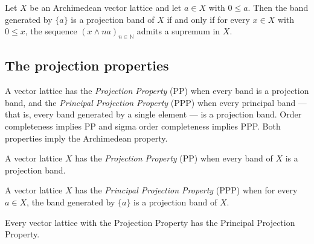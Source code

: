 \begin{theorem}
\label{thm:projectionBand-principalBand-projectionBand-iff-isLUB-range}
\leanok
{}
Let $X$ be an Archimedean vector lattice and let $a \in X$ with
$0 \le a$. Then the band generated by $\{a\}$ is a projection band of
$X$ if and only if for every $x \in X$ with $0 \le x$, the sequence
$(x \wedge n a)_{n \in \mathbb{N}}$ admits a supremum in $X$.
\end{theorem}

\subsection{The projection properties}

A vector lattice has the \emph{Projection Property} (PP) when every
band is a projection band, and the \emph{Principal Projection
Property} (PPP) when every principal band — that is, every band
generated by a single element — is a projection band. Order
completeness implies PP and sigma order completeness implies PPP. Both
properties imply the Archimedean property.

\begin{definition}
\label{def:hasProjectionProperty}
\leanok
{}
A vector lattice $X$ has the \emph{Projection Property} (PP) when
every band of $X$ is a projection band.
\end{definition}

\begin{definition}
\label{def:hasPrincipalProjectionProperty}
\leanok
{}
A vector lattice $X$ has the \emph{Principal Projection Property}
(PPP) when for every $a \in X$, the band generated by $\{a\}$ is a
projection band of $X$.
\end{definition}

\begin{lemma}
\label{lem:hasPrincipalProjectionProperty-of-hasProjectionProperty}
\leanok
{}
Every vector lattice with the Projection Property has the Principal
Projection Property.
\end{lemma}

